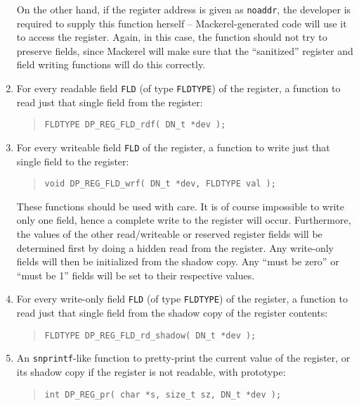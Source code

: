 \documentclass[a4paper,11pt,twoside]{report}
\begin{document}
\begin{enumerate}
  On the other hand, if the register address is given as
  \texttt{noaddr}, the developer is required to supply this function
  herself -- Mackerel-generated code will use it to access the
  register.  Again, in this case, the function should not try to
  preserve fields, since Mackerel will make sure that the
  ``sanitized'' register and field writing functions will do this
  correctly. 

\item For every readable field \texttt{FLD} (of type \texttt{FLDTYPE})
  of the register, a function to read just that single field from the
  register: 
  \begin{quote}
    \texttt{FLDTYPE DP\_REG\_FLD\_rdf( DN\_t *dev );}
  \end{quote}

\item For every writeable field \texttt{FLD} of the register, a function to
  write just that single field to the register:
  \begin{quote}
    \texttt{void DP\_REG\_FLD\_wrf( DN\_t *dev, \texttt{FLDTYPE} val );}
  \end{quote}
  
  These functions should be used with care.  It is of
  course impossible to write only one field, hence a complete write to
  the register will occur.  Furthermore, the values of the other
  read/writeable or reserved register fields will be determined first
  by doing a hidden read from the register.   Any write-only 
  fields will then be initialized from the shadow copy.  Any ``must be
  zero'' or ``must be 1'' fields will be set to their respective values.  

\item For every write-only field \texttt{FLD} (of type \texttt{FLDTYPE})
  of the register, a function to read just that single field from the
  shadow copy of the register contents: 
  \begin{quote}
    \texttt{FLDTYPE DP\_REG\_FLD\_rd\_shadow( DN\_t *dev );}
  \end{quote}
  
\item An \texttt{snprintf}-like function to pretty-print the
  current value of the register, or its shadow copy if the register is
  not readable, with prototype:
  \begin{quote}
    \texttt{int DP\_REG\_pr( char *s, size\_t sz, DN\_t *dev );}
  \end{quote}

\end{enumerate}
\end{document}
